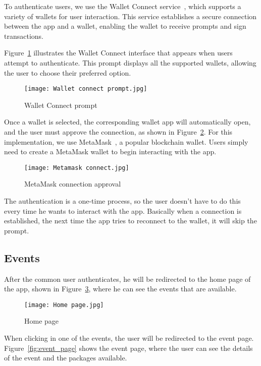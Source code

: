 To authenticate users, we use the Wallet Connect service~\cite{wallet_connect},
which supports a variety of wallets for user interaction. This service
establishes a secure connection between the app and a wallet, enabling the
wallet to receive prompts and sign transactions.

Figure~\ref{fig:wallet_connect_prompt} illustrates the Wallet Connect interface
that appears when users attempt to authenticate. This prompt displays all the
supported wallets, allowing the user to choose their preferred option.

\begin{figure}[H]
	\centering
	\texttt{[image: Wallet connect prompt.jpg]}
	\caption{Wallet Connect prompt}\label{fig:wallet_connect_prompt}
\end{figure}

Once a wallet is selected, the corresponding wallet app will automatically
open, and the user must approve the connection, as shown in
Figure~\ref{fig:metamask_connect}. For this implementation, we use
MetaMask~\cite{metamask}, a popular blockchain wallet. Users simply need to
create a MetaMask wallet to begin interacting with the app.

\begin{figure}[H]
	\centering
	\texttt{[image: Metamask connect.jpg]}
	\caption{MetaMask connection approval}\label{fig:metamask_connect}
\end{figure}

The authentication is a one-time process, so the user doesn't have to do this
every time he wants to interact with the app. Basically when a connection is
established, the next time the app tries to reconnect to the wallet, it will
skip the prompt.

\subsection{Events}\label{subsec:events}

After the common user authenticates, he will be redirected to the home page of
the app, shown in Figure~\ref{fig:home_page}, where he can see the events that
are available.

\begin{figure}[H]
	\texttt{[image: Home page.jpg]}
	\centering
	\caption{Home page}\label{fig:home_page}
\end{figure}

When clicking in one of the events, the user will be redirected to the event
page. Figure~\ref{fig:event_page} shows the event page, where the user can see
the details of the event and the packages available.

